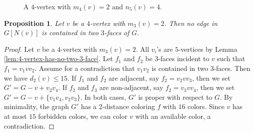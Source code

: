 \documentclass[12pt, reqno]{amsart}
\theoremstyle{plain}
\newtheorem{proposition}[equation]{Proposition}
\theoremstyle{definition}
\numberwithin{equation}{section}
\begin{document}
\begin{figure}[htb]
\centering   
{}  
\caption{A $4$-vertex with $m_4(v)=2$ and $n_5(v)=4$.}
\label{fig:4-adj-faces}
\end{figure}





\begin{proposition}\label{prop:4-vertex-no-common}
Let $v$ be a $4$-vertex with $m_3(v)=2$. Then no edge in $G[N(v)]$ is contained in two $3$-faces of $G$.
\end{proposition}
\begin{proof}
Let $v$ be a $4$-vertex with  $m_3(v)=2$. %
All $v_i$'s are $5$-vertices by Lemma \ref{lem:4-vertex-has-no-two-3-face}. 
Let $f_1$ and $f_2$ be $3$-faces incident to $v$ such that $f_1=v_1vv_{2}$. Assume for a contradiction that $v_1v_{2}$ is contained in two $3$-faces. Then we have  $d_2(v)\leq 15$. If $f_1$ and $f_2$ are adjacent, say $f_2=v_2vv_{3}$, then  we set $G'=G-v+v_2v_4$. If $f_2$ and $f_3$ are non-adjacent, say $f_2=v_3vv_{4}$, then we set $G'=G-v+\{v_1v_4,v_2v_3\}$. 
In both cases,  $G'$ is proper with respect to $G$. By minimality, the graph $G'$ has a 2-distance coloring $f$ with $16$ colors. Since $v$ has at most $15$ forbidden colors, we can color $v$ with an available color, a contradiction.
\end{proof}
\end{document}
